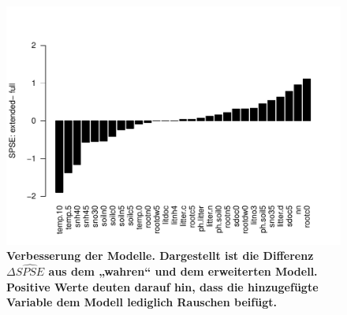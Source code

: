 \begin{figure}[htbp]
	\centering
	\includegraphics[width=\textwidth]{fig/simul/delta-spse.pdf}
	\caption{\bf{Verbesserung der Modelle.} 
		Dargestellt ist die Differenz $\Delta \widehat{SPSE}$ aus dem „wahren“ und dem erweiterten Modell.
		Positive Werte deuten darauf hin, dass die hinzugefügte Variable dem Modell lediglich Rauschen beifügt.
	}
	\label{fig-simul-delta-spse}
\end{figure}
